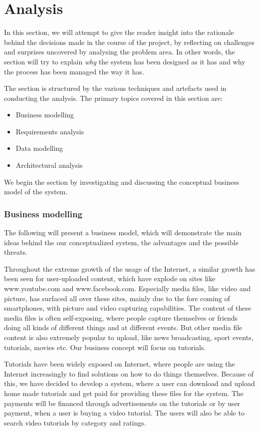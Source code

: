 \part{Analysis}
In this section, we will attempt to give the reader insight into the rationale behind the decisions made in the course of the project, by reflecting on challenges and surprises uncovered by analysing the problem area. In other words, the section will try to explain \textit{why} the system has been designed as it has and why the process has been managed the way it has.

The section is structured by the various techniques and artefacts used in conducting the analysis. The primary topics covered in this section are:
\begin{itemize}
\item Business modelling
\item Requirements analysis
\item Data modelling
\item Architectural analysis
\end{itemize}
We begin the section by investigating and discussing the conceptual business model of the system.

\section{Business modelling} \label{BusinessModel}
The following will present a business model, which will demonstrate the main ideas behind the our conceptualized system, the advantages and the possible threats.

Throughout the extreme growth of the usage of the Internet, a similar growth has been seen for user-uploaded content, which have explode on sites like www.youtube.com and www.facebook.com. Especially media files, like video and picture, has surfaced all over these sites, mainly due to the fore coming of smartphones, with picture and video capturing capabilities. The content of these media files is often self-exposing, where people capture themselves or friends doing all kinds of different things and at different events. But other media file content is also extremely popular to upload, like news broadcasting, sport events, tutorials, movies etc. Our business concept will focus on tutorials.

Tutorials have been widely exposed on Internet, where people are using the Internet increasingly to find solutions on how to do things themselves. Because of this, we have decided to develop a system, where a user can download and upload home made tutorials and get paid for providing these files for the system. The payments will be financed through advertisements on the tutorials or by user payment, when a user is buying a video tutorial. The users will also be able to search video tutorials by category and ratings.

